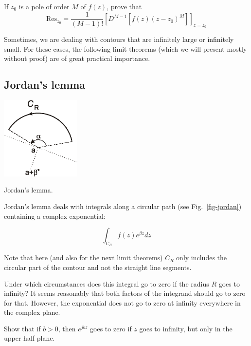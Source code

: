 \begin{exer}
If $z_0$ is a pole of order $M$ of $f(z)$, prove that
$$\mathrm{Res}_{z_0} = \frac{1}{(M-1)!}{\left[D^{M-1}[f(z)(z-z_0)^M]\right]}_{z=z_0}$$
\end{exer}


\pagebreak



Sometimes, we are dealing with contours that are infinitely large or infinitely small. For these cases, the following limit theorems (which we will present mostly without proof) are of great practical importance.

\subsection*{Jordan's lemma}

\begin{marginfigure}
\centering
\includegraphics[width=4cm]{complex/figures/jordan}
\caption{Jordan's lemma.}
\label{fig-jordan}
\end{marginfigure}

Jordan's lemma deals with integrals along a circular path  (see Fig.~\ref{fig-jordan}) containing a complex exponential: 

$$ \int_{{C}_R} f(z) e^{\beta z} dz$$

Note that here (and also for the next limit theorems) ${{C}_R}$ only includes the circular part of the contour and not the straight line segments.

Under which circumstances does this integral go to zero if the radius $R$ goes to infinity? It seems reasonably that both factors of the integrand should go to zero for that. However, the exponential does not go to zero at infinity everywhere in the complex plane. 

\begin{cue}
Show that if $b>0$, then $e^{jbz}$ goes to zero if $z$ goes to infinity, but only in the upper half plane.
\end{cue}


